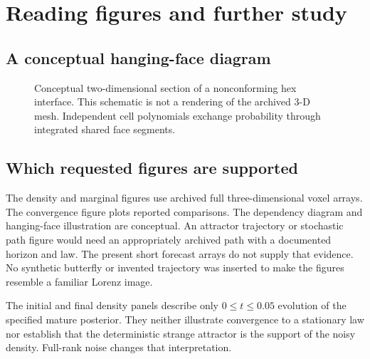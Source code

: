 \chapter{Reading figures and further study}
\section{A conceptual hanging-face diagram}
\begin{figure}[htbp]\centering
{}
\caption{Conceptual two-dimensional section of a nonconforming hex interface. This schematic is not a rendering of the archived 3-D mesh. Independent cell polynomials exchange probability through integrated shared face segments.}\end{figure}

\section{Which requested figures are supported}
The density and marginal figures use archived full three-dimensional voxel arrays. The convergence figure plots reported comparisons. The dependency diagram and hanging-face illustration are conceptual. An attractor trajectory or stochastic path figure would need an appropriately archived path with a documented horizon and law. The present short forecast arrays do not supply that evidence. No synthetic butterfly or invented trajectory was inserted to make the figures resemble a familiar Lorenz image.

The initial and final density panels describe only $0\le t\le0.05$ evolution of the specified mature posterior. They neither illustrate convergence to a stationary law nor establish that the deterministic strange attractor is the support of the noisy density. Full-rank noise changes that interpretation.

